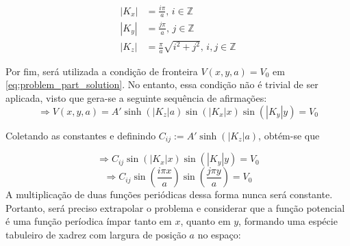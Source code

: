\documentclass{report}
\begin{document}
\vspace*{-1.5\baselineskip}
\begin{center}
  \begin{align}
    \label{eq:Kx_values}
    |K_x| &= \frac{i\pi}{a},\, i \in \mathbb{Z} \\
    \label{eq:Ky_values}
    |K_y| &= \frac{j\pi}{a},\, j \in \mathbb{Z} \\
    \label{eq:Kz_values}
    |K_z| &= \frac{\pi}{a}\sqrt{i^2 + j^2},\, i, j \in \mathbb{Z}
  \end{align}
\end{center}

Por fim, será utilizada a condição de fronteira $ V(x, y, a) = V_0 $ em \ref{eq:problem_part_solution}.
No entanto, essa condição não é trivial de ser aplicada, visto que gera-se
a seguinte sequência de afirmações:
$$ \Rightarrow V(x, y, a) = A'\sinh(|K_z|a)\sin(|K_x|x)\sin(|K_y|y) = V_0 $$

Coletando as constantes e definindo $ C_{ij} := A'\sinh(|K_z|a) $, obtém-se que

$$ \Rightarrow C_{ij}\sin(|K_x|x)\sin(|K_y|y) = V_0 $$
$$ \Rightarrow C_{ij}\sin\left(\frac{i\pi x}{a}\right)\sin\left(\frac{j\pi y}{a}\right) = V_0 $$
\clearpage
A multiplicação de duas funções periódicas dessa forma nunca será constante. Portanto, será
preciso extrapolar o problema e considerar que a função potencial é uma função períodica ímpar tanto em
$ x $, quanto em $ y $, formando uma espécie tabuleiro de xadrez com largura de posição $ a $ no espaço:
\end{document}
